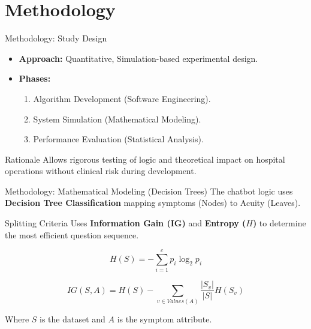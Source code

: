 \documentclass[aspectratio=169,12pt]{beamer}
\begin{document}
	\section{Methodology }
	
	\begin{frame}{Methodology: Study Design}
		\begin{itemize}
			\item \textbf{Approach:} Quantitative, Simulation-based experimental design.
			\item \textbf{Phases:}
			\begin{enumerate}
				\item Algorithm Development (Software Engineering).
				\item System Simulation (Mathematical Modeling).
				\item Performance Evaluation (Statistical Analysis).
			\end{enumerate}
		\end{itemize}
		
		\begin{exampleblock}{Rationale}
			Allows rigorous testing of logic and theoretical impact on hospital operations without clinical risk during development.
		\end{exampleblock}
	\end{frame}
	
	\begin{frame}{Methodology: Mathematical Modeling (Decision Trees)}
		The chatbot logic uses \textbf{Decision Tree Classification} mapping symptoms (Nodes) to Acuity (Leaves).
		
		\begin{block}{Splitting Criteria}
			Uses \textbf{Information Gain (IG)} and \textbf{Entropy ($H$)} to determine the most efficient question sequence.
		\end{block}
		
		\begin{equation}\label{entropy}
			H(S) = - \sum_{i=1}^{c} p_i \log_2 p_i
		\end{equation}
		
		\begin{equation}\label{infogain}
			IG(S, A) = H(S) - \sum_{v \in Values(A)} \frac{|S_v|}{|S|} H(S_v)
		\end{equation}
		
		\small{Where $S$ is the dataset and $A$ is the symptom attribute.}
	\end{frame}
	
\end{document}
